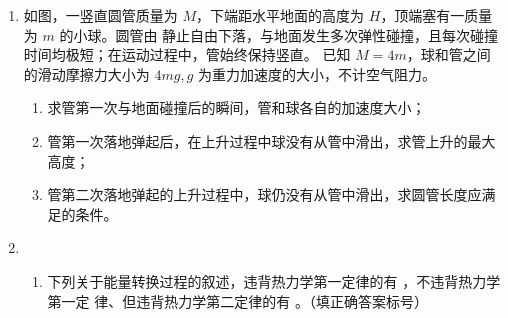 \begin{enumerate}



\newpage
\item
如图，一竖直圆管质量为 $ M $，下端距水平地面的高度为 $ H $，顶端塞有一质量为 $ m $ 的小球。圆管由
静止自由下落，与地面发生多次弹性碰撞，且每次碰撞时间均极短；在运动过程中，管始终保持竖直。
已知 $ M=4m $，球和管之间的滑动摩擦力大小为 $ 4mg,g $ 为重力加速度的大小，不计空气阻力。
\begin{enumerate}
\item
求管第一次与地面碰撞后的瞬间，管和球各自的加速度大小；
\item 
管第一次落地弹起后，在上升过程中球没有从管中滑出，求管上升的最大高度；
\item 
管第二次落地弹起的上升过程中，球仍没有从管中滑出，求圆管长度应满足的条件。

\end{enumerate}
\begin{figure}[h!]
\flushright

\end{figure}




\newpage



\item
\begin{enumerate}
\item
下列关于能量转换过程的叙述，违背热力学第一定律的有 \underlinegap ，不违背热力学第一定
律、但违背热力学第二定律的有 \underlinegap 。（填正确答案标号）


\end{enumerate}
\end{enumerate}
